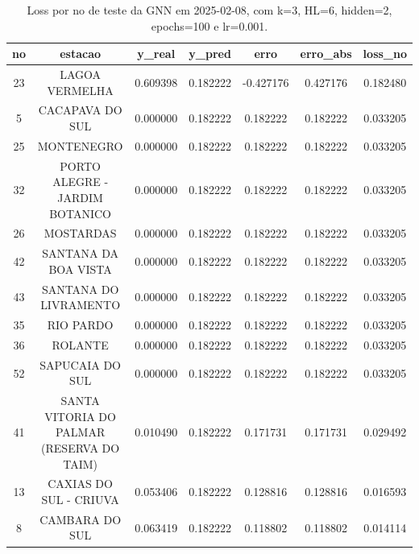 \begin{table}[h]
\centering
\caption{Loss por no de teste da GNN em 2025-02-08, com k=3, HL=6, hidden=2, epochs=100 e lr=0.001.}
\label{tab:gnn_loss_k3_hl6_h2_e100_d20250208}
\begin{tabular}{ccccccc}
\toprule
no & estacao & y\_real & y\_pred & erro & erro\_abs & loss\_no \\
\midrule
23 & LAGOA VERMELHA & 0.609398 & 0.182222 & -0.427176 & 0.427176 & 0.182480 \\
5 & CACAPAVA DO SUL & 0.000000 & 0.182222 & 0.182222 & 0.182222 & 0.033205 \\
25 & MONTENEGRO & 0.000000 & 0.182222 & 0.182222 & 0.182222 & 0.033205 \\
32 & PORTO ALEGRE - JARDIM BOTANICO & 0.000000 & 0.182222 & 0.182222 & 0.182222 & 0.033205 \\
26 & MOSTARDAS & 0.000000 & 0.182222 & 0.182222 & 0.182222 & 0.033205 \\
42 & SANTANA DA BOA VISTA & 0.000000 & 0.182222 & 0.182222 & 0.182222 & 0.033205 \\
43 & SANTANA DO LIVRAMENTO & 0.000000 & 0.182222 & 0.182222 & 0.182222 & 0.033205 \\
35 & RIO PARDO & 0.000000 & 0.182222 & 0.182222 & 0.182222 & 0.033205 \\
36 & ROLANTE & 0.000000 & 0.182222 & 0.182222 & 0.182222 & 0.033205 \\
52 & SAPUCAIA DO SUL & 0.000000 & 0.182222 & 0.182222 & 0.182222 & 0.033205 \\
41 & SANTA VITORIA DO PALMAR (RESERVA DO TAIM) & 0.010490 & 0.182222 & 0.171731 & 0.171731 & 0.029492 \\
13 & CAXIAS DO SUL - CRIUVA & 0.053406 & 0.182222 & 0.128816 & 0.128816 & 0.016593 \\
8 & CAMBARA DO SUL & 0.063419 & 0.182222 & 0.118802 & 0.118802 & 0.014114 \\
\bottomrule
\end{tabular}
\end{table}
